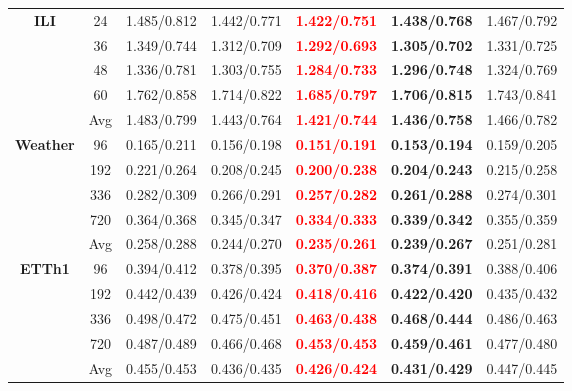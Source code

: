 \begin{table}[!htbp]
{\begin{tabular}{c|c|c|c|c|c|c}
\midrule
\multirow{5}{*}{\textbf{ILI}}
& 24 & 1.485/0.812 & 1.442/0.771 & \textbf{\textcolor{red}{1.422/0.751}} & \textbf{1.438/0.768} & 1.467/0.792 \\
& 36 & 1.349/0.744 & 1.312/0.709 & \textbf{\textcolor{red}{1.292/0.693}} & \textbf{1.305/0.702} & 1.331/0.725 \\
& 48 & 1.336/0.781 & 1.303/0.755 & \textbf{\textcolor{red}{1.284/0.733}} & \textbf{1.296/0.748} & 1.324/0.769 \\
& 60 & 1.762/0.858 & 1.714/0.822 & \textbf{\textcolor{red}{1.685/0.797}} & \textbf{1.706/0.815} & 1.743/0.841 \\
& Avg & 1.483/0.799 & 1.443/0.764 & \textbf{\textcolor{red}{1.421/0.744}} & \textbf{1.436/0.758} & 1.466/0.782 \\
\midrule
\multirow{5}{*}{\textbf{Weather}}
& 96 & 0.165/0.211 & 0.156/0.198 & \textbf{\textcolor{red}{0.151/0.191}} & \textbf{0.153/0.194} & 0.159/0.205 \\
& 192 & 0.221/0.264 & 0.208/0.245 & \textbf{\textcolor{red}{0.200/0.238}} & \textbf{0.204/0.243} & 0.215/0.258 \\
& 336 & 0.282/0.309 & 0.266/0.291 & \textbf{\textcolor{red}{0.257/0.282}} & \textbf{0.261/0.288} & 0.274/0.301 \\
& 720 & 0.364/0.368 & 0.345/0.347 & \textbf{\textcolor{red}{0.334/0.333}} & \textbf{0.339/0.342} & 0.355/0.359 \\
& Avg & 0.258/0.288 & 0.244/0.270 & \textbf{\textcolor{red}{0.235/0.261}} & \textbf{0.239/0.267} & 0.251/0.281 \\
\midrule
\multirow{5}{*}{\textbf{ETTh1}}
& 96 & 0.394/0.412 & 0.378/0.395 & \textbf{\textcolor{red}{0.370/0.387}} & \textbf{0.374/0.391} & 0.388/0.406 \\
& 192 & 0.442/0.439 & 0.426/0.424 & \textbf{\textcolor{red}{0.418/0.416}} & \textbf{0.422/0.420} & 0.435/0.432 \\
& 336 & 0.498/0.472 & 0.475/0.451 & \textbf{\textcolor{red}{0.463/0.438}} & \textbf{0.468/0.444} & 0.486/0.463 \\
& 720 & 0.487/0.489 & 0.466/0.468 & \textbf{\textcolor{red}{0.453/0.453}} & \textbf{0.459/0.461} & 0.477/0.480 \\
& Avg & 0.455/0.453 & 0.436/0.435 & \textbf{\textcolor{red}{0.426/0.424}} & \textbf{0.431/0.429} & 0.447/0.445 \\
\bottomrule
\end{tabular}
}

\end{table}
